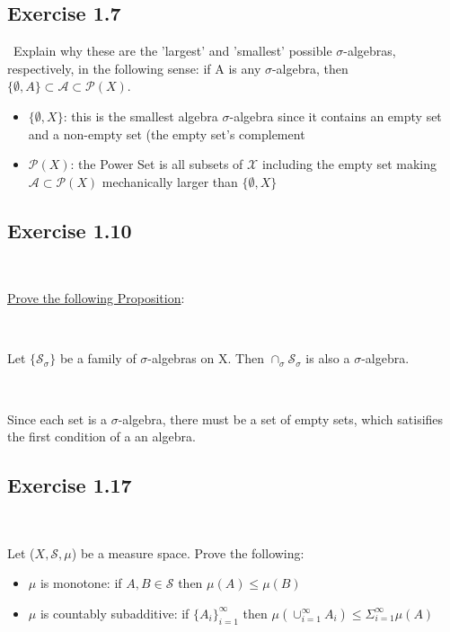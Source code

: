 \documentclass{article}
\theoremstyle{definition}
\begin{document}
\subsection{Exercise 1.7}
\
Explain why these are the ’largest’ and ’smallest’ possible $\sigma$-algebras, respectively, in the following sense: if A is any $\sigma$-algebra, then $\{\emptyset, A\} \subset \mathcal{A} \subset \mathcal{P}(X)$.

\begin{itemize}

\item $\{\emptyset, X \}$: this is the smallest algebra $\sigma$-algebra since it contains an empty set and a non-empty set (the empty set's complement
\item $\mathcal{P}(X)$: the Power Set is all subsets of $\mathcal{X}$ including the empty set making $\mathcal{A} \subset \mathcal{P}(X)$ mechanically larger than $\{\emptyset, X\}$

\end{itemize}

\subsection{Exercise 1.10}

\

\underline{Prove the following Proposition}:

\

Let $\{\mathcal{S}_\sigma\}$ be a family of $\sigma$-algebras on X. Then $\cap_\sigma \mathcal{S}_\sigma$ is also a $\sigma$-algebra.

\

Since each set is a $\sigma$-algebra, there must be a set of empty sets, which satisifies the first condition of a an algebra.

\subsection{Exercise 1.17}

\

Let ($X, \mathcal{S}, \mu$) be a measure space. Prove the following:

\begin{itemize}

\item $\mu$ is monotone: if $A, B \in \mathcal{S}$ then $\mu(A) \leq \mu(B)$
\item $\mu$ is countably subadditive: if $\{A_i\}_{i=1}^\infty$ then $\mu(\cup_{i=1}^\infty A_i) \leq \Sigma_{i=1}^\infty \mu(A)$

\end{itemize}
\end{document}
